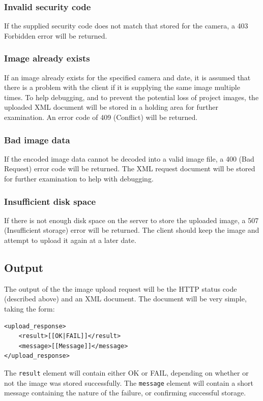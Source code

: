 \documentclass[11pt]{article}
\begin{document}
\subsubsection{Invalid security code}
If the supplied security code does not match that stored for the camera, a 403 Forbidden error will be returned.

\subsubsection{Image already exists}
If an image already exists for the specified camera and date, it is assumed that there is a problem with the client if it is supplying the same image multiple times. To help debugging, and to prevent the potential loss of project images, the uploaded XML document will be stored in a holding area for further examination. An error code of 409 (Conflict) will be returned.

\subsubsection{Bad image data}
If the encoded image data cannot be decoded into a valid image file, a 400 (Bad Request) error code will be returned. The XML request document will be stored for further examination to help with debugging.

\subsubsection{Insufficient disk space}
If there is not enough disk space on the server to store the uploaded image, a 507 (Insufficient storage) error will be returned. The client should keep the image and attempt to upload it again at a later date.

\subsection{Output}
The output of the the image upload request will be the HTTP status code (described above) and an XML document. The document will be very simple, taking the form:

\begin{verbatim}
<upload_response>
    <result>[[OK|FAIL]]</result>
    <message>[[Message]]</message>
</upload_response>
\end{verbatim}

The \verb+result+ element will contain either OK or FAIL, depending on whether or not the image was stored successfully. The \verb+message+ element will contain a short message containing the nature of the failure, or confirming successful storage.
\end{document}
